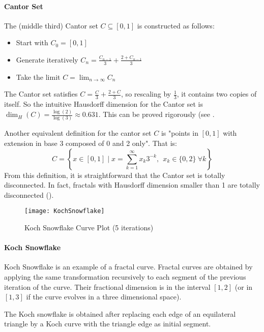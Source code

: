 \paragraph{Cantor Set}
The (middle third) Cantor set $C \subseteq \left[ 0,1 \right] $ is constructed as follows:
\begin{itemize}
	\item Start with $C_0 = \left[ 0,1 \right]$
	\item Generate iteratively $C_n = \frac{C_{n-1}}{3} + \frac{2 + C_{n-1}}{3}$
	\item Take the limit $C = \lim_{n \to \infty} C_n$
\end{itemize}

The Cantor set satisfies $C = \frac{C}{3} + \frac{2 + C}{3}$, so rescaling by $\frac{1}{3}$, it contains two copies of itself.
So the intuitive Hausdorff dimension for the Cantor set is $\dim_H(C) = \frac{\log(2)}{\log(3)} \approx 0.631$.
This can be proved rigorously (see \cite[p. 34-35, ex. 2.7]{Falconer_1990}.

Another equivalent definition for the cantor set $C$ is "points in $\left[ 0,1 \right]$ with extension in base 3 composed of 0 and 2 only".
That is:
$$
C = \left\lbrace x \in \left[ 0,1 \right] \mid x = \sum_{k=1}^{\infty} x_k 3^{-k}, \ \ x_k \in \{0,2\} \ \forall k \right\rbrace
$$
From this definition, it is straightforward that the Cantor set is totally disconnected.
In fact, fractals with Hausdorff dimension smaller than 1 are totally disconnected (\cite[p. 33, prop. 2.5]{Falconer_1990}).

\begin{wrapfigure}{r}{5cm}
	\vspace{-0.5cm}
	\texttt{[image: KochSnowflake]}
	\centering
	\captionsetup{justification=centering}
	\caption{Koch Snowflake Curve Plot (5 iterations)}
	\label{fig:KochSnowflake}
\end{wrapfigure}
\paragraph{Koch Snowflake}
Koch Snowflake is an example of a fractal curve.
Fractal curves are obtained by applying the same transformation recursively to each segment of the previous iteration of the curve.
Their fractional dimension is in the interval $\left[ 1,2 \right]$ (or in $\left[ 1,3 \right]$ if the curve evolves in a three dimensional space).

The Koch snowflake is obtained after replacing each edge of an equilateral triangle by a Koch curve with the triangle edge as initial segment.

